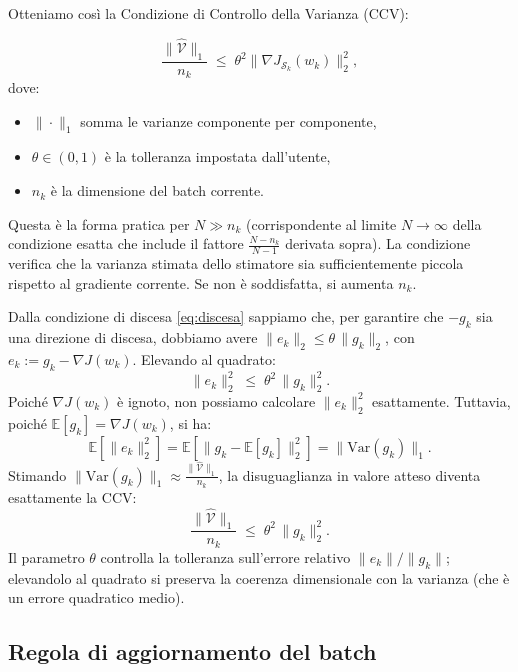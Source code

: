 \documentclass[italian, a4paper, twoside, binding=6mm]{sapthesis}
\begin{document}
Otteniamo cos\`i la Condizione di Controllo della Varianza (CCV):

\begin{thmbox}
  \[
    \frac{\|\widehat{\mathcal{V}}\|_1}{n_k} \;\leq\; \theta^2 \|\nabla J_{\mathcal{S}_k}(w_k)\|_2^2,
  \]
  dove:
  \begin{itemize}
    \setlength{\itemsep}{0pt}\setlength{\topsep}{2pt}\setlength{\parskip}{0pt}
    \item $\|\cdot\|_1$ somma le varianze componente per componente,
    \item $\theta \in (0,1)$ \`e la tolleranza impostata dall'utente,
    \item $n_k$ \`e la dimensione del batch corrente.
  \end{itemize}
  Questa \`e la forma pratica per $N \gg n_k$ (corrispondente al limite $N\to\infty$ della condizione esatta che include il fattore $\frac{N-n_k}{N-1}$ derivata sopra). La condizione verifica che la varianza stimata dello stimatore sia sufficientemente piccola rispetto al gradiente corrente. Se non \`e soddisfatta, si aumenta $n_k$.
\end{thmbox}
\enlargethispage{5\baselineskip}%
\begin{notebox}

Dalla condizione di discesa \eqref{eq:discesa} sappiamo che, per garantire che $-g_k$ sia una direzione di discesa, dobbiamo avere $\|e_k\|_2 \le \theta\,\|g_k\|_2$, con $e_k := g_k - \nabla J(w_k)$. Elevando al quadrato:
\[
\|e_k\|_2^2 \;\le\; \theta^2\, \|g_k\|_2^2.
\]
Poiché $\nabla J(w_k)$ è ignoto, non possiamo calcolare $\|e_k\|_2^2$ esattamente. Tuttavia, poiché $\mathbb{E}[g_k] = \nabla J(w_k)$, si ha:
\[
\mathbb{E}\left[\|e_k\|_2^2\right] = \mathbb{E}\left[\|g_k - \mathbb{E}[g_k]\|_2^2\right] = \|\mathrm{Var}(g_k)\|_1.
\]
Stimando $\|\mathrm{Var}(g_k)\|_1 \approx \frac{\|\widehat{\mathcal{V}}\|_1}{n_k}$, la disuguaglianza in valore atteso diventa esattamente la CCV:
\[
\frac{\|\widehat{\mathcal{V}}\|_1}{n_k} \;\le\; \theta^2\, \|g_k\|_2^2.
\]
Il parametro $\theta$ controlla la tolleranza sull'errore relativo $\|e_k\|/\|g_k\|$; elevandolo al quadrato si preserva la coerenza dimensionale con la varianza (che è un errore quadratico medio).
\end{notebox}


\subsection{Regola di aggiornamento del batch}
\end{document}
